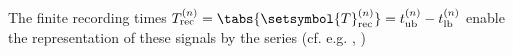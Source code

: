 The finite recording times
$T_{ \text{rec} }^{(n)} = \tabs{ \setsymbol{T}_{ \text{rec} }^{(n)} } = t_{\text{ub}}^{(n)} - t_{\text{lb}}^{(n)}$ enable
the representation of
these signals by
the  series
(cf. e.g.
\cite[(2.2.1/2)]{book:Manolakis2005},
\cite[(2.12/13)]{book:Briggs1995}%
)
